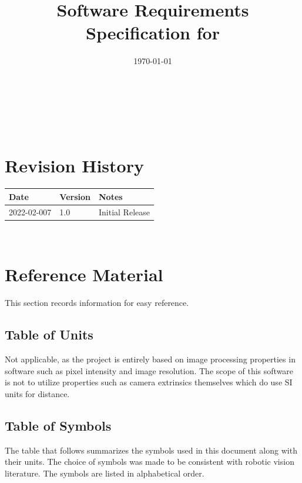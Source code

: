 \documentclass[12pt]{article}
\begin{document}
\title{Software Requirements Specification for \progname} 
\author{\authname}
\date{\today}
	
\maketitle

~\newpage


\tableofcontents

~\newpage

\section*{Revision History}

\begin{tabularx}{\textwidth}{p{3cm}p{2cm}X}
\toprule {\bf Date} & {\bf Version} & {\bf Notes}\\
\midrule
2022-02-007 & 1.0 & Initial Release\\
\bottomrule
\end{tabularx}
~\newpage

\section{Reference Material}

This section records information for easy reference.

\subsection{Table of Units}
Not applicable, as the project is entirely based on image processing 
properties in software such as pixel intensity and image resolution. 
The scope of this software is not to utilize properties such as camera 
extrinsics themselves which do use SI units for distance.

\subsection{Table of Symbols}

The table that follows summarizes the symbols used in this document along with
their units.  The choice of symbols was made to be consistent with robotic vision literature. 
The symbols are listed in alphabetical order.
\end{document}
